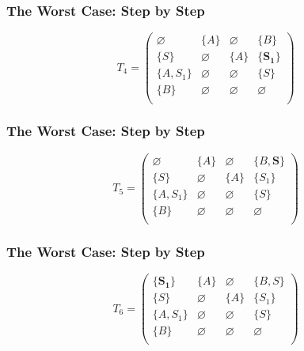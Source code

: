 \documentclass[xcolor=table]{beamer}
\begin{document}
\begin{frame}[noframenumbering]
  \transwipe[direction=90]
  \frametitle{The Worst Case: Step by Step}
\begin{figure}[h]
\[
T_4 = \begin{pmatrix}
\varnothing & \{A\}       & \varnothing & \{B\}       \\
\{S\}       & \varnothing & \{A\}       & \{\pmb{S_1}\}     \\
\{A, S_1\}  & \varnothing & \varnothing & \{S\}       \\
\{B\}       & \varnothing & \varnothing & \varnothing \\
\end{pmatrix}
\]
\label{ExampleQueryFirstIteration}
\end{figure}
\end{frame} 

\begin{frame}[noframenumbering]
  \transwipe[direction=90]
  \frametitle{The Worst Case: Step by Step}
\begin{figure}[h]
\[
T_5 = \begin{pmatrix}
\varnothing & \{A\}       & \varnothing & \{B, \pmb{S}\}    \\
\{S\}       & \varnothing & \{A\}       & \{S_1\}     \\
\{A, S_1\}  & \varnothing & \varnothing & \{S\}       \\
\{B\}       & \varnothing & \varnothing & \varnothing \\
\end{pmatrix}
\]
\label{ExampleQueryFirstIteration}
\end{figure}
\end{frame} 

\begin{frame}[noframenumbering]
  \transwipe[direction=90]
  \frametitle{The Worst Case: Step by Step}
\begin{figure}[h]
\[
T_6 = \begin{pmatrix}
\{\pmb{S_1}\}     & \{A\}       & \varnothing & \{B, S\}    \\
\{S\}       & \varnothing & \{A\}       & \{S_1\}     \\
\{A, S_1\}  & \varnothing & \varnothing & \{S\}       \\
\{B\}       & \varnothing & \varnothing & \varnothing \\
\end{pmatrix}
\]
\label{ExampleQueryFirstIteration}
\end{figure}
\end{frame} 
\end{document}

